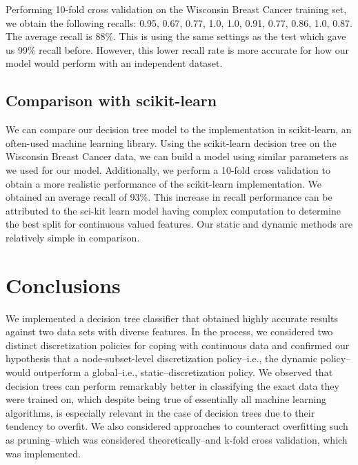 \documentclass[12pt, conference, compsocconf]{IEEEtran}
\begin{document}
Performing 10-fold cross validation on the Wisconsin Breast Cancer training
set, we obtain the following recalls: 0.95, 0.67, 0.77, 1.0, 1.0, 0.91, 0.77,
0.86, 1.0, 0.87.  The average recall is 88\%.  This is using the same settings
as the test which gave us 99\% recall before.  However, this lower recall rate
is more accurate for how our model would perform with an independent dataset.

\subsection{Comparison with scikit-learn}
We can compare our decision tree model to the implementation in scikit-learn,
an often-used machine learning library.  Using the scikit-learn decision tree
on the Wisconsin Breast Cancer data, we can build a model using similar
parameters as we used for our model.  Additionally, we perform a 10-fold cross
validation to obtain a more realistic performance of the scikit-learn
implementation.  We obtained an average recall of 93\%.  This increase in
recall performance can be attributed to the sci-kit learn model having complex
computation to determine the best split for continuous valued features.  Our
static and dynamic methods are relatively simple in comparison.


\section{Conclusions}
We implemented a decision tree classifier that obtained highly accurate results against two data sets with diverse features.
In the process, we considered two distinct discretization policies for coping with continuous data and confirmed our hypothesis that a node-subset-level discretization policy--i.e., the dynamic policy--would outperform a global--i.e., static--discretization policy. 
We observed that decision trees can perform remarkably better in classifying the exact data they were trained on, which despite being true of essentially all machine learning algorithms, is especially relevant in the case of decision trees due to their tendency to overfit.
We also considered approaches to counteract overfitting such as pruning--which was considered theoretically--and k-fold cross validation, which was implemented. 

%
%
\end{document}
